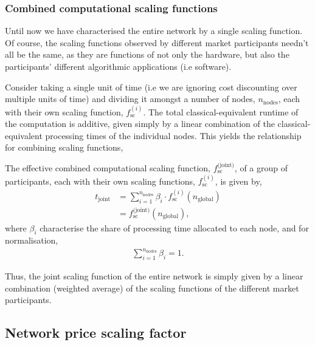 %
%

\subsubsection{Combined computational scaling functions}\label{sec:comb_comp_sc_func}

Until now we have characterised the entire network by a single scaling function. Of course, the scaling functions observed by different market participants needn't all be the same, as they are functions of not only the hardware, but also the participants' different algorithmic applications (i.e software).

Consider taking a single unit of time (i.e we are ignoring cost discounting over multiple units of time) and dividing it amongst a number of nodes, $n_\text{nodes}$, each with their own scaling function, $f_\text{sc}^{(i)}$. The total classical-equivalent runtime of the computation is additive, given simply by a linear combination of the classical-equivalent processing times of the individual nodes. This yields the relationship for combining scaling functions,
\begin{definition}\label{def:comb_sc_func}
The effective combined computational scaling function, $f_\text{sc}^\text{(joint)}$, of a group of participants, each with their own scaling functions, $f_\text{sc}^{(i)}$, is given by,
\begin{align}
	t_\text{joint} &= \sum_{i=1}^{n_{\text{nodes}}} \beta_i \cdot f_\text{sc}^{(i)}(n_\text{global}) \nonumber \\
	&= f_\text{sc}^\text{(joint)}(n_\text{global}),
\end{align}
where $\beta_i$ characterise the share of processing time allocated to each node, and for normalisation,
\begin{align}
\sum_{i=1}^{n_\text{nodes}} \beta_i = 1.
\end{align}

\end{definition}

Thus, the joint scaling function of the entire network is simply given by a linear combination (weighted average) of the scaling functions of the different market participants.

%
%

\subsection{Network price scaling factor}\label{sec:NPSF}

